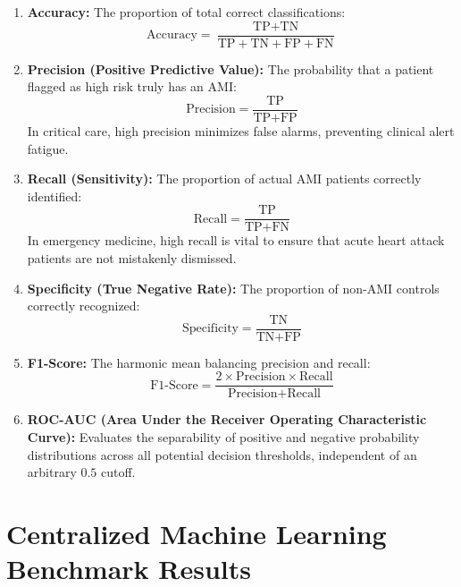 \documentclass[12pt,a4paper,oneside]{report}
\begin{document}
\begin{enumerate}
    \item \textbf{Accuracy:} The proportion of total correct classifications:
    \begin{equation}
    \text{Accuracy} = \frac{\text{TP} + \text{TN}}{\text{TP} + \text{TN} + \text{FP} + \text{FN}}
    \end{equation}
    
    \item \textbf{Precision (Positive Predictive Value):} The probability that a patient flagged as high risk truly has an AMI:
    \begin{equation}
    \text{Precision} = \frac{\text{TP}}{\text{TP} + \text{FP}}
    \end{equation}
    In critical care, high precision minimizes false alarms, preventing clinical alert fatigue.
    
    \item \textbf{Recall (Sensitivity):} The proportion of actual AMI patients correctly identified:
    \begin{equation}
    \text{Recall} = \frac{\text{TP}}{\text{TP} + \text{FN}}
    \end{equation}
    In emergency medicine, high recall is vital to ensure that acute heart attack patients are not mistakenly dismissed.
    
    \item \textbf{Specificity (True Negative Rate):} The proportion of non-AMI controls correctly recognized:
    \begin{equation}
    \text{Specificity} = \frac{\text{TN}}{\text{TN} + \text{FP}}
    \end{equation}
    
    \item \textbf{F1-Score:} The harmonic mean balancing precision and recall:
    \begin{equation}
    \text{F1-Score} = \frac{2 \times \text{Precision} \times \text{Recall}}{\text{Precision} + \text{Recall}}
    \end{equation}
    
    \item \textbf{ROC-AUC (Area Under the Receiver Operating Characteristic Curve):} Evaluates the separability of positive and negative probability distributions across all potential decision thresholds, independent of an arbitrary $0.5$ cutoff.
\end{enumerate}

\section{Centralized Machine Learning Benchmark Results}
\label{sec:centralized_results}
\end{document}
